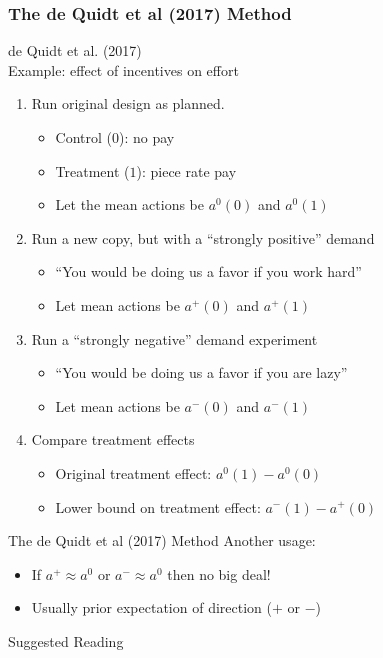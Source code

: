 \begin{frame}
\frametitle{The de Quidt et al (2017) Method}
de Quidt et al. (2017)\\
Example: effect of incentives on effort
\begin{enumerate}
    \item Run original design as planned.
    \begin{itemize}
        \item Control ($0$): no pay
        \item Treatment ($1$): piece rate pay
        \item Let the mean actions be $a^0(0)$ and $a^0(1)$
    \end{itemize}
    \item Run a new copy, but with a ``strongly positive'' demand
    \begin{itemize}
        \item ``You would be doing us a favor if you work hard''
        \item Let mean actions be $a^+(0)$ and $a^+(1)$
    \end{itemize}
    \item Run a ``strongly negative'' demand experiment
    \begin{itemize}
        \item ``You would be doing us a favor if you are lazy''
        \item Let mean actions be $a^-(0)$ and $a^-(1)$
    \end{itemize}
    \item Compare treatment effects
    \begin{itemize}
        \item Original treatment effect: $a^0(1)-a^0(0)$
        \item Lower bound on treatment effect: $a^-(1)-a^+(0)$
    \end{itemize}
\end{enumerate}
\end{frame}

\begin{frame}{The de Quidt et al (2017) Method}
Another usage:
\begin{itemize}
    \item If $a^+\approx a^0$ or $a^-\approx a^0$ then no big deal!
    \item Usually prior expectation of direction ($+$ or $-$)
\end{itemize}
    
\end{frame}


\nocite{}

\begin{frame}[allowframebreaks]{Suggested Reading}
    
\end{frame}


